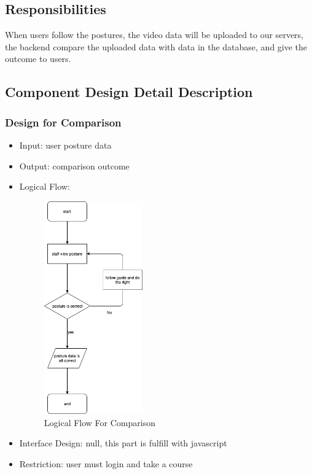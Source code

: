 \documentclass[16pt]{scrreprt}
\begin{document}
\subsection{Responsibilities}
When users follow the postures, the video data will be uploaded to our servers, the backend compare the uploaded data with data in the database, and give the outcome to users.

\subsection{Component Design Detail Description}
\subsubsection{Design for Comparison}
\begin{itemize}
    \item Input: user posture data
    \item Output: comparison outcome
    \item Logical Flow:
    \begin{figure}[H]
        \centering
        \includegraphics[width=0.4\textwidth]{diagrams/flow-comparison.png}
        \caption{Logical Flow For Comparison}
    \end{figure}
    \item Interface Design: null, this part is fulfill with javascript
    \item Restriction: user must login and take a course
\end{itemize}
\end{document}
